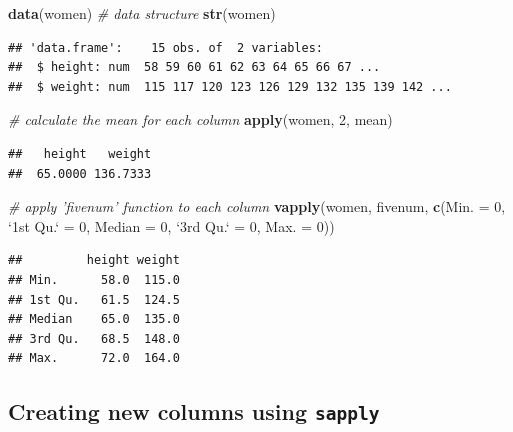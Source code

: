 \documentclass[]{book}
\makeatletter
\newenvironment{Shaded}{\begin{snugshade}}{\end{snugshade}}
\newcommand{\KeywordTok}[1]{\textcolor[rgb]{0.13,0.29,0.53}{\textbf{#1}}}
\newcommand{\DataTypeTok}[1]{\textcolor[rgb]{0.13,0.29,0.53}{#1}}
\newcommand{\DecValTok}[1]{\textcolor[rgb]{0.00,0.00,0.81}{#1}}
\newcommand{\StringTok}[1]{\textcolor[rgb]{0.31,0.60,0.02}{#1}}
\newcommand{\CommentTok}[1]{\textcolor[rgb]{0.56,0.35,0.01}{\textit{#1}}}
\newcommand{\NormalTok}[1]{#1}
\newenvironment{kframe}{%
\medskip{}
\setlength{\fboxsep}{.8em}
 \def\at@end@of@kframe{}%
 \ifinner\ifhmode%
  \def\at@end@of@kframe{\end{minipage}}%
  \begin{minipage}{\columnwidth}%
 \fi\fi%
 \def\FrameCommand##1{\hskip\@totalleftmargin \hskip-\fboxsep
 \colorbox{shadecolor}{##1}\hskip-\fboxsep
     \hskip-\linewidth \hskip-\@totalleftmargin \hskip\columnwidth}%
 \MakeFramed {\advance\hsize-\width
   \@totalleftmargin\z@ \linewidth\hsize
   \@setminipage}}%
 {\par\unskip\endMakeFramed%
 \at@end@of@kframe}
\renewenvironment{Shaded}{\begin{kframe}}{\end{kframe}}
\theoremstyle{definition}
\theoremstyle{definition}
\theoremstyle{definition}
\theoremstyle{remark}
\makeatother
\begin{document}
\begin{Shaded}
\begin{Highlighting}[]
\KeywordTok{data}\NormalTok{(women)}
\CommentTok{# data structure}
\KeywordTok{str}\NormalTok{(women)}
\end{Highlighting}
\end{Shaded}

\begin{verbatim}
## 'data.frame':    15 obs. of  2 variables:
##  $ height: num  58 59 60 61 62 63 64 65 66 67 ...
##  $ weight: num  115 117 120 123 126 129 132 135 139 142 ...
\end{verbatim}

\begin{Shaded}
\begin{Highlighting}[]
\CommentTok{# calculate the mean for each column}
\KeywordTok{apply}\NormalTok{(women, }\DecValTok{2}\NormalTok{, mean)}
\end{Highlighting}
\end{Shaded}

\begin{verbatim}
##   height   weight 
##  65.0000 136.7333
\end{verbatim}

\begin{Shaded}
\begin{Highlighting}[]
\CommentTok{# apply 'fivenum' function to each column}
\KeywordTok{vapply}\NormalTok{(women, fivenum, }\KeywordTok{c}\NormalTok{(}\DataTypeTok{Min. =} \DecValTok{0}\NormalTok{, }\StringTok{`}\DataTypeTok{1st Qu.}\StringTok{`}\NormalTok{ =}\StringTok{ }\DecValTok{0}\NormalTok{, }\DataTypeTok{Median =} \DecValTok{0}\NormalTok{, }\StringTok{`}\DataTypeTok{3rd Qu.}\StringTok{`}\NormalTok{ =}\StringTok{ }\DecValTok{0}\NormalTok{, }
    \DataTypeTok{Max. =} \DecValTok{0}\NormalTok{))}
\end{Highlighting}
\end{Shaded}

\begin{verbatim}
##         height weight
## Min.      58.0  115.0
## 1st Qu.   61.5  124.5
## Median    65.0  135.0
## 3rd Qu.   68.5  148.0
## Max.      72.0  164.0
\end{verbatim}

\subsection{\texorpdfstring{Creating new columns using
\texttt{sapply}}{Creating new columns using sapply}}\label{creating-new-columns-using-sapply}
\end{document}

